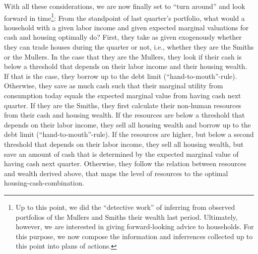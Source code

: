 \documentclass[11pt]{article} %
\begin{document}
With all these considerations, we are now finally set to ``turn around'' and look forward in time\footnote{Up to this point, we did the ``detective work'' of inferring from observed portfolios of the Mullers and Smiths their wealth last period. Ultimately, however, we are interested in giving forward-looking advice to households. For this purpose, we now compose the information and inferrences collected up to this point into plans of actions.}: From the standpoint of last quarter's portfolio, what would a household with a given labor income and given expected marginal valuations for cash and housing optimally do? First, they take as given exogenously whether they can trade houses during the quarter or not, i.e., whether they are the Smiths or the Mullers. In the case that they are the Mullers, they look if their cash is below a threshold that depends on their labor income and their housing wealth. If that is the case, they borrow up to the debt limit (``hand-to-mouth''-rule). Otherwise, they save as much cash such that their marginal utility from consumption today equals the expected marginal value from having cash next quarter. If they are the Smiths, they first calculate their non-human resources from their cash and housing wealth. If the resources are below a threshold that depends on their labor income, they sell all housing wealth and borrow up to the debt limit (``hand-to-mouth''-rule). If the resources are higher, but below a second threshold that depends on their labor income, they sell all housing wealth, but save an amount of cash that is determined by the expected marginal value of having cash next quarter. Otherwise, they follow the relation between resources and wealth derived above, that maps the level of resources to the optimal housing-cash-combination.
\end{document}
